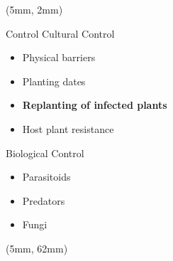 \begin{frame}{}
    \begin{textblock*}{55mm}(5mm, 2mm)
        \begin{bluebox}{Control}
            Cultural Control
            \begin{itemize}[<+->]
                \item
                    Physical barriers
                \item
                    Planting dates
                \item
                    \textbf{Replanting of infected plants}
                \item
                    Host plant resistance
            \end{itemize}
            Biological Control
            \tcblower
            \begin{itemize}[<+->]
                \item
                    Parasitoids
                \item
                    Predators
                \item
                    Fungi
            \end{itemize}
        \end{bluebox}
    \end{textblock*}
    \begin{textblock*}{55mm}(5mm, 62mm)
\end{textblock*}
\end{frame}
